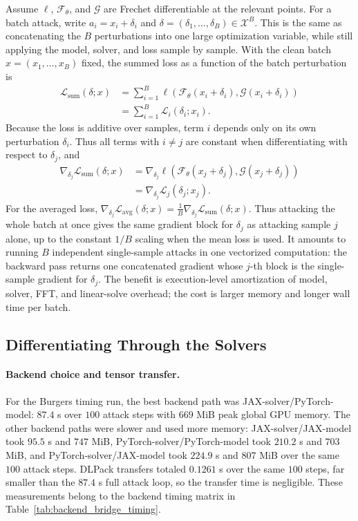 ﻿\documentclass[letterpaper]{article} %
\newcommand{\tabref}[1]{Table~\ref{#1}}
\begin{document}
Assume $\ell$, $\mathcal{F}_\theta$, and $\mathcal{G}$ are Frechet
differentiable at the relevant points. For a batch attack, write
$a_i=x_i+\delta_i$ and
\(\delta=(\delta_1,\ldots,\delta_B)\in\mathcal X^B\). This is the same as
concatenating the \(B\) perturbations into one large optimization variable,
while still applying the model, solver, and loss sample by sample. With the
clean batch \(x=(x_1,\ldots,x_B)\) fixed, the summed loss as a function of the
batch perturbation is
\begin{align}
  \mathcal L_{\mathrm{sum}}(\delta;x)
  &=
  \sum_{i=1}^{B}
  \ell\!\left(
    \mathcal{F}_\theta(x_i+\delta_i),
    \mathcal{G}(x_i+\delta_i)
  \right)
  \nonumber\\
  &=
  \sum_{i=1}^{B}\mathcal L_i(\delta_i;x_i).
\end{align}
Because the loss is additive over samples, term \(i\) depends only on its own
perturbation \(\delta_i\). Thus all terms with \(i\ne j\) are constant when
differentiating with respect to \(\delta_j\), and
\begin{align}
  \nabla_{\delta_j}\mathcal L_{\mathrm{sum}}(\delta;x)
  &=
  \nabla_{\delta_j}
  \ell\!\left(
    \mathcal{F}_\theta(x_j+\delta_j),
    \mathcal{G}(x_j+\delta_j)
  \right)
  \nonumber\\
  &=
  \nabla_{\delta_j}\mathcal L_j(\delta_j;x_j).
\end{align}
For the averaged loss,
\(\nabla_{\delta_j}\mathcal L_{\mathrm{avg}}(\delta;x)
=\frac{1}{B}\nabla_{\delta_j}\mathcal L_{\mathrm{sum}}(\delta;x)\).
Thus attacking the whole batch at once gives the same gradient block for
\(\delta_j\) as attacking sample \(j\) alone, up to the constant $1/B$ scaling
when the mean loss is used. It amounts to running \(B\) independent
single-sample attacks in one vectorized computation: the backward pass returns
one concatenated gradient whose \(j\)-th block is the single-sample gradient for
\(\delta_j\). The benefit is execution-level amortization of model, solver, FFT,
and linear-solve overhead; the cost is larger memory and longer wall time per
batch.

\subsection*{Differentiating Through the Solvers}

\paragraph{Backend choice and tensor transfer.}
For the Burgers timing run, the best backend path was JAX-solver/PyTorch-model:
$87.4$ s over $100$ attack steps with $669$ MiB peak global GPU memory. The
other backend paths were slower and used more memory: JAX-solver/JAX-model took
$95.5$ s and $747$ MiB, PyTorch-solver/PyTorch-model took $210.2$ s and $703$
MiB, and PyTorch-solver/JAX-model took $224.9$ s and $807$ MiB over the same
$100$ attack steps. DLPack transfers totaled $0.1261$ s over the same $100$
steps, far smaller than the $87.4$ s full attack loop, so the transfer time is
negligible. These measurements belong to the backend timing matrix in
\tabref{tab:backend_bridge_timing}.
\end{document}
